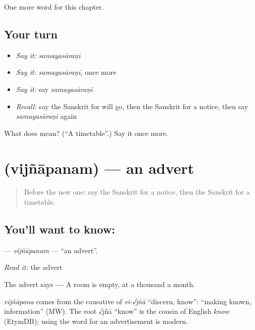 \begin{grammarlens}[title={What you've built}]
One more word for this chapter.
\end{grammarlens}

\subsection*{Your turn}
\begin{itemize}
\raggedright
  \item \emph{Say it:} \emph{samayasāraṇī}
  \item \emph{Say it:} \emph{samayasāraṇī}, once more
  \item \emph{Say it:} say \emph{samayasāraṇī}
  \item \emph{Recall:} say the Sanskrit for will go, then the Sanskrit for a notice, then say \emph{samayasāraṇī} again
\end{itemize}

\begin{tcolorbox}[breakable,colback=teal!4,colframe=teal!35!black,title={Before you move on}]
What does  mean? (\textquotedblleft{}A timetable\textquotedblright{}.) Say it once more.
\end{tcolorbox}
\section[\texorpdfstring{\sk{विज्ञापनम्} (vijñāpanam)}{विज्ञापनम् (vijñāpanam)}]{ (vijñāpanam) — an advert}

\label{lesson:SA-C140-vijnapanam}



\begin{quote}
Before the new one: say the Sanskrit for a notice, then the Sanskrit for a timetable.
\end{quote}

\subsection*{You'll want to know: }
\textbf{} — \emph{vijñāpanam} — \textquotedblleft{}an advert\textquotedblright{}.

\emph{Read it:} the advert

The advert says \textbf{   —  } A room is empty, at a thousand a month.

\begin{cousinweb}
\emph{vijñāpana} comes from the causative of \emph{vi-√jñā} \textquotedblleft{}discern, know\textquotedblright{}: \textquotedblleft{}making known, information\textquotedblright{} (MW). The root √jñā \textquotedblleft{}know\textquotedblright{} is the cousin of English \emph{know} (EtymDB); using the word for an advertisement is modern.
\end{cousinweb}

